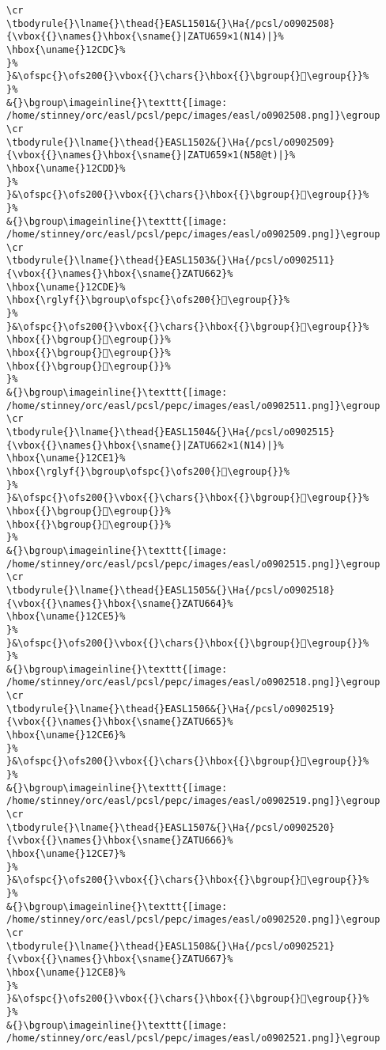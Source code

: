 \begin{verbatim}
\cr
\tbodyrule{}\lname{}\thead{}EASL1501&{}\Ha{/pcsl/o0902508}{\vbox{{}\names{}\hbox{\sname{}|ZATU659×1(N14)|}%
\hbox{\uname{}12CDC}%
}%
}&\ofspc{}\ofs200{}\vbox{{}\chars{}\hbox{{}\bgroup{}𒳜\egroup{}}%
}%
&{}\bgroup\imageinline{}\texttt{[image: /home/stinney/orc/easl/pcsl/pepc/images/easl/o0902508.png]}\egroup
\cr
\tbodyrule{}\lname{}\thead{}EASL1502&{}\Ha{/pcsl/o0902509}{\vbox{{}\names{}\hbox{\sname{}|ZATU659×1(N58@t)|}%
\hbox{\uname{}12CDD}%
}%
}&\ofspc{}\ofs200{}\vbox{{}\chars{}\hbox{{}\bgroup{}𒳝\egroup{}}%
}%
&{}\bgroup\imageinline{}\texttt{[image: /home/stinney/orc/easl/pcsl/pepc/images/easl/o0902509.png]}\egroup
\cr
\tbodyrule{}\lname{}\thead{}EASL1503&{}\Ha{/pcsl/o0902511}{\vbox{{}\names{}\hbox{\sname{}ZATU662}%
\hbox{\uname{}12CDE}%
\hbox{\rglyf{}\bgroup\ofspc{}\ofs200{}𒳞\egroup{}}%
}%
}&\ofspc{}\ofs200{}\vbox{{}\chars{}\hbox{{}\bgroup{}𒳤\egroup{}}%
\hbox{{}\bgroup{}𒳠\egroup{}}%
\hbox{{}\bgroup{}𒳞\egroup{}}%
\hbox{{}\bgroup{}𒳢\egroup{}}%
}%
&{}\bgroup\imageinline{}\texttt{[image: /home/stinney/orc/easl/pcsl/pepc/images/easl/o0902511.png]}\egroup
\cr
\tbodyrule{}\lname{}\thead{}EASL1504&{}\Ha{/pcsl/o0902515}{\vbox{{}\names{}\hbox{\sname{}|ZATU662×1(N14)|}%
\hbox{\uname{}12CE1}%
\hbox{\rglyf{}\bgroup\ofspc{}\ofs200{}𒳡\egroup{}}%
}%
}&\ofspc{}\ofs200{}\vbox{{}\chars{}\hbox{{}\bgroup{}𒳡\egroup{}}%
\hbox{{}\bgroup{}𒳟\egroup{}}%
\hbox{{}\bgroup{}𒳣\egroup{}}%
}%
&{}\bgroup\imageinline{}\texttt{[image: /home/stinney/orc/easl/pcsl/pepc/images/easl/o0902515.png]}\egroup
\cr
\tbodyrule{}\lname{}\thead{}EASL1505&{}\Ha{/pcsl/o0902518}{\vbox{{}\names{}\hbox{\sname{}ZATU664}%
\hbox{\uname{}12CE5}%
}%
}&\ofspc{}\ofs200{}\vbox{{}\chars{}\hbox{{}\bgroup{}𒳥\egroup{}}%
}%
&{}\bgroup\imageinline{}\texttt{[image: /home/stinney/orc/easl/pcsl/pepc/images/easl/o0902518.png]}\egroup
\cr
\tbodyrule{}\lname{}\thead{}EASL1506&{}\Ha{/pcsl/o0902519}{\vbox{{}\names{}\hbox{\sname{}ZATU665}%
\hbox{\uname{}12CE6}%
}%
}&\ofspc{}\ofs200{}\vbox{{}\chars{}\hbox{{}\bgroup{}𒳦\egroup{}}%
}%
&{}\bgroup\imageinline{}\texttt{[image: /home/stinney/orc/easl/pcsl/pepc/images/easl/o0902519.png]}\egroup
\cr
\tbodyrule{}\lname{}\thead{}EASL1507&{}\Ha{/pcsl/o0902520}{\vbox{{}\names{}\hbox{\sname{}ZATU666}%
\hbox{\uname{}12CE7}%
}%
}&\ofspc{}\ofs200{}\vbox{{}\chars{}\hbox{{}\bgroup{}𒳧\egroup{}}%
}%
&{}\bgroup\imageinline{}\texttt{[image: /home/stinney/orc/easl/pcsl/pepc/images/easl/o0902520.png]}\egroup
\cr
\tbodyrule{}\lname{}\thead{}EASL1508&{}\Ha{/pcsl/o0902521}{\vbox{{}\names{}\hbox{\sname{}ZATU667}%
\hbox{\uname{}12CE8}%
}%
}&\ofspc{}\ofs200{}\vbox{{}\chars{}\hbox{{}\bgroup{}𒳨\egroup{}}%
}%
&{}\bgroup\imageinline{}\texttt{[image: /home/stinney/orc/easl/pcsl/pepc/images/easl/o0902521.png]}\egroup

\end{verbatim}
